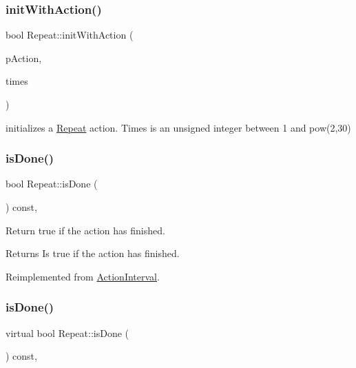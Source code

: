 \subsubsection{\texorpdfstring{init\+With\+Action()}{initWithAction()}\hspace{0.1cm}{\footnotesize\ttfamily [2/2]}}
{\footnotesize\ttfamily bool Repeat\+::init\+With\+Action (\begin{DoxyParamCaption}\item[{\hyperlink{classFiniteTimeAction}{Finite\+Time\+Action} $\ast$}]{p\+Action,  }\item[{unsigned int}]{times }\end{DoxyParamCaption})}

initializes a \hyperlink{classRepeat}{Repeat} action. Times is an unsigned integer between 1 and pow(2,30) \mbox{\label{classRepeat_a01f8323eda5c46d6f103e8f8c5027f30}} 
\subsubsection{\texorpdfstring{is\+Done()}{isDone()}\hspace{0.1cm}{\footnotesize\ttfamily [1/2]}}
{\footnotesize\ttfamily bool Repeat\+::is\+Done (\begin{DoxyParamCaption}\item[{void}]{ }\end{DoxyParamCaption}) const\hspace{0.3cm}{\ttfamily [override]}, {\ttfamily [virtual]}}

Return true if the action has finished.

\begin{DoxyReturn}{Returns}
Is true if the action has finished. 
\end{DoxyReturn}


Reimplemented from \hyperlink{classActionInterval_a466ff6a3a5f95e47d4d01bfa4775290d}{Action\+Interval}.

\mbox{\label{classRepeat_a2efd4a590fb52dbc862b1e086509b87a}} 
\subsubsection{\texorpdfstring{is\+Done()}{isDone()}\hspace{0.1cm}{\footnotesize\ttfamily [2/2]}}
{\footnotesize\ttfamily virtual bool Repeat\+::is\+Done (\begin{DoxyParamCaption}\item[{void}]{ }\end{DoxyParamCaption}) const\hspace{0.3cm}{\ttfamily [override]}, {\ttfamily [virtual]}}

